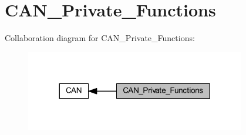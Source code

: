 \hypertarget{group___c_a_n___private___functions}{}\section{C\+A\+N\+\_\+\+Private\+\_\+\+Functions}
\label{group___c_a_n___private___functions}
Collaboration diagram for C\+A\+N\+\_\+\+Private\+\_\+\+Functions\+:
\nopagebreak
\begin{figure}[H]
\begin{center}
\leavevmode
\includegraphics[width=272pt]{group___c_a_n___private___functions}
\end{center}
\end{figure}
